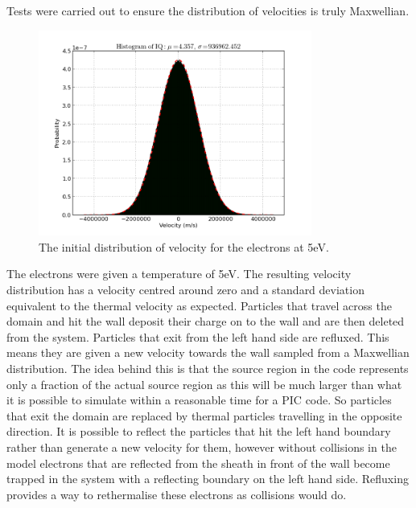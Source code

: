 \documentclass[12pt]{article}
\begin{document}
Tests were carried out to ensure the distribution of velocities is truly Maxwellian. 
\begin{figure}[H]
\centering
\includegraphics[width=0.8\textwidth]{maxwell.png}
\caption{The initial distribution of velocity for the electrons at 5eV.}
\end{figure}
The electrons were given a temperature of 5eV. The resulting velocity distribution has a velocity centred around zero and a standard deviation equivalent to the thermal velocity as expected.
Particles that travel across the domain and hit the wall deposit their charge on to the wall and are then deleted from the system. Particles that exit from the left hand side are refluxed. This means they are given a new velocity towards the wall sampled from a Maxwellian distribution. The idea behind this is that the source region in the code represents only a fraction of the actual source region as this will be much larger than what it is possible to simulate within a reasonable time for a PIC code. So particles that exit the domain are replaced by thermal particles travelling in the opposite direction. It is possible to reflect the particles that hit the left hand boundary rather than generate a new velocity for them, however without collisions in the model electrons that are reflected from the sheath in front of the wall become trapped in the system with a reflecting boundary on the left hand side. Refluxing provides a way to rethermalise these electrons as collisions would do.
\end{document}
